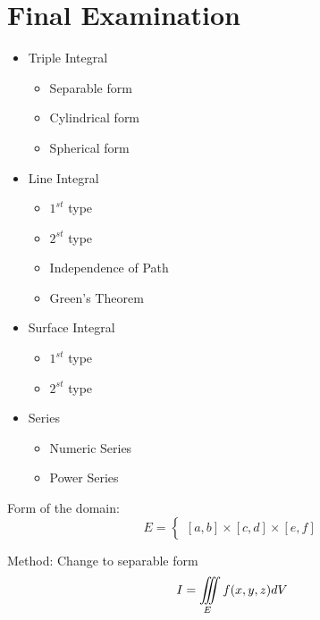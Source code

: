 \chapter{Final Examination}

  \begin{itemize}
    \item Triple Integral
      \begin{itemize}
        \item Separable form
        \item Cylindrical form
        \item Spherical form
      \end{itemize}
    \item Line Integral
      \begin{itemize}
        \item $1^{st}$ type
        \item $2^{st}$ type
        \item Independence of Path
        \item Green's Theorem
      \end{itemize}
    \item Surface Integral
      \begin{itemize}
        \item $1^{st}$ type
        \item $2^{st}$ type
      \end{itemize}
    \item Series
      \begin{itemize}
        \item Numeric Series
        \item Power Series
      \end{itemize}
  \end{itemize}

    \par Form of the domain:
      \begin{equation}
        E =
        \begin{cases}
          [a, b] \times [c, d] \times [e, f]
        \end{cases}
      \end{equation}
    \par Method: Change to separable form
      \begin{equation}
        I = \iiint \limits_{E} f(x, y, z) dV
      \end{equation}